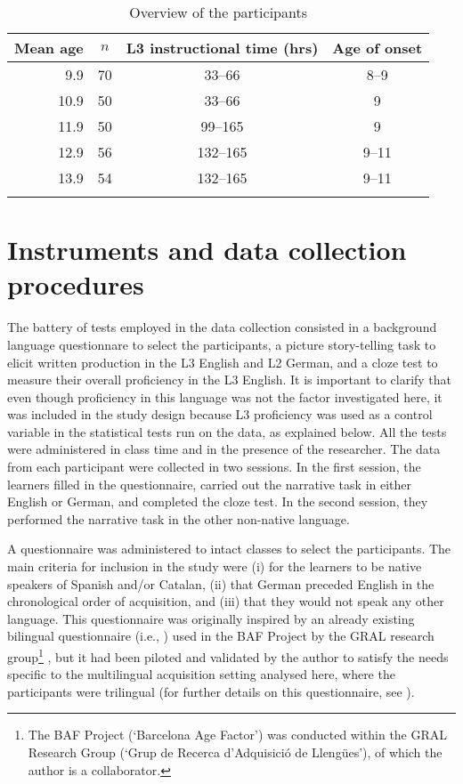 \documentclass[output=paper,modfonts,nonflat, newtxmath]{langsci/langscibook}
\begin{document}
\begin{table}
\caption{Overview of the participants\label{tab:sanchez7:2}}
\begin{tabular}{r c c c}
\lsptoprule
Mean age & $n$ & L3 instructional time (hrs) & Age of onset\\
\midrule
9.9 & 70 & 33--66  & 8--9\\
10.9 & 50 & 33--66 & 9\\
11.9 & 50 & \hphantom{1}99--165  & 9\\
12.9 & 56 & 132--165 & 9--11\\
13.9 & 54 & 132--165 & 9--11\\
\lspbottomrule
\end{tabular}
\end{table}

\section{{Instruments} {and} {data} {collection} {procedures} }
\label{sec:sanchez7:5}

The battery of tests employed in the data collection consisted in a background language questionnare to select the participants, a picture story-telling task to elicit written production in the L3 English and L2 German, and a cloze test to measure their overall proficiency in the L3 English. It is important to clarify that even though proficiency in this language was not the factor investigated here, it was included in the study design because L3 proficiency was used as a control variable in the statistical tests run on the data, as explained below. All the tests were administered in class time and in the presence of the researcher. The data from each participant were collected in two sessions. In the first session, the learners filled in the questionnaire, carried out the narrative task in either English or German, and completed the cloze test. In the second session, they performed the narrative task in the other non-native language.

A questionnaire was administered to intact classes to select the participants. The main criteria for inclusion in the study were (i) for the learners to be native speakers of Spanish and/or Catalan, (ii) that German preceded English in the chronological order of acquisition, and (iii) that they would not speak any other language. This questionnaire was originally inspired by an already existing bilingual questionnaire (i.e., \citealt{BakerPrys1998}) used in the BAF Project by the GRAL research group\footnote{The BAF Project (‘Barcelona Age Factor’) was conducted within the GRAL Research Group (‘Grup de Recerca d’Adquisició de Llengües’), of which the author is a collaborator.} , but it had been piloted and validated by the author \citep{Sánchez2011} to satisfy the needs specific to the multilingual acquisition setting analysed here, where the participants were trilingual (for further details on this questionnaire, see \citealt{Sánchez2015L2}).
\end{document}
